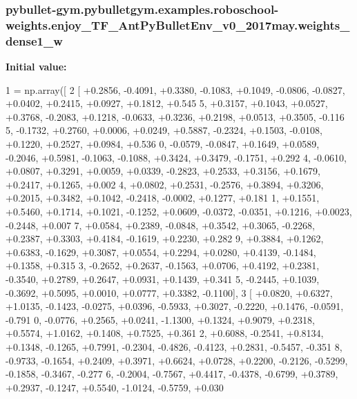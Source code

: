 \subsubsection[{\texorpdfstring{weights\+\_\+dense1\+\_\+w}{weights_dense1_w}}]{\setlength{\rightskip}{0pt plus 5cm}pybullet-\/gym.\+pybulletgym.\+examples.\+roboschool-\/weights.\+enjoy\+\_\+\+T\+F\+\_\+\+Ant\+Py\+Bullet\+Env\+\_\+v0\+\_\+2017may.\+weights\+\_\+dense1\+\_\+w}\hypertarget{namespacepybullet-gym_1_1pybulletgym_1_1examples_1_1roboschool-weights_1_1enjoy___t_f___ant_py_bullet_env__v0__2017may_ae01ad0dc9068d109f155b0671a58eb16}{}\label{namespacepybullet-gym_1_1pybulletgym_1_1examples_1_1roboschool-weights_1_1enjoy___t_f___ant_py_bullet_env__v0__2017may_ae01ad0dc9068d109f155b0671a58eb16}
{\bfseries Initial value\+:}
\begin{DoxyCode}
1 = np.array([
2 [ +0.2856, -0.4091, +0.3380, -0.1083, +0.1049, -0.0806, -0.0827, +0.0402, +0.2415, +0.0927, +0.1812, +0.545
      5, +0.3157, +0.1043, +0.0527, +0.3768, -0.2083, +0.1218, -0.0633, +0.3236, +0.2198, +0.0513, +0.3505, -0.116
      5, -0.1732, +0.2760, +0.0006, +0.0249, +0.5887, -0.2324, +0.1503, -0.0108, +0.1220, +0.2527, +0.0984, +0.536
      0, -0.0579, -0.0847, +0.1649, +0.0589, -0.2046, +0.5981, -0.1063, -0.1088, +0.3424, +0.3479, -0.1751, +0.292
      4, -0.0610, +0.0807, +0.3291, +0.0059, +0.0339, -0.2823, +0.2533, +0.3156, +0.1679, +0.2417, +0.1265, +0.002
      4, +0.0802, +0.2531, -0.2576, +0.3894, +0.3206, +0.2015, +0.3482, +0.1042, -0.2418, -0.0002, +0.1277, +0.181
      1, +0.1551, +0.5460, +0.1714, +0.1021, -0.1252, +0.0609, -0.0372, -0.0351, +0.1216, +0.0023, -0.2448, +0.007
      7, +0.0584, +0.2389, -0.0848, +0.3542, +0.3065, -0.2268, +0.2387, +0.3303, +0.4184, -0.1619, +0.2230, +0.282
      9, +0.3884, +0.1262, +0.6383, -0.1629, +0.3087, +0.0554, +0.2294, +0.0280, +0.4139, -0.1484, +0.1358, +0.315
      3, -0.2652, +0.2637, -0.1563, +0.0706, +0.4192, +0.2381, -0.3540, +0.2789, +0.2647, +0.0931, +0.1439, +0.341
      5, -0.2445, +0.1039, -0.3692, +0.5095, +0.0010, +0.0777, +0.3382, -0.1100],
3 [ +0.0820, +0.6327, +1.0135, -0.1423, -0.0275, +0.0396, -0.5933, +0.3027, -0.2220, +0.1476, -0.0591, -0.791
      0, -0.0776, +0.2565, +0.0241, -1.1300, +0.1324, +0.9079, +0.2318, +0.5574, +1.0162, +0.1408, +0.7525, +0.361
      2, +0.6088, -0.2541, +0.8134, +0.1348, -0.1265, +0.7991, -0.2304, -0.4826, -0.4123, +0.2831, -0.5457, -0.351
      8, -0.9733, -0.1654, +0.2409, +0.3971, +0.6624, +0.0728, +0.2200, -0.2126, -0.5299, -0.1858, -0.3467, -0.277
      6, -0.2004, -0.7567, +0.4417, -0.4378, -0.6799, +0.3789, +0.2937, -0.1247, +0.5540, -1.0124, -0.5759, +0.030

\end{DoxyCode}
